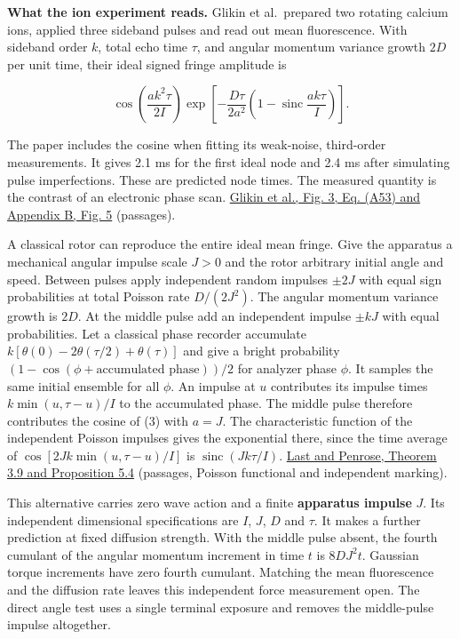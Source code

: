 \documentclass[11pt,a4paper]{article}
\begin{document}
\textbf{What the ion experiment reads.} Glikin et al.~prepared two
rotating calcium ions, applied three sideband pulses and read out mean
fluorescence. With sideband order \(k\), total echo time \(\tau\), and
angular momentum variance growth \(2D\) per unit time, their ideal
signed fringe amplitude is

\[
 \cos\!\left(\frac{a k^2\tau}{2I}\right)
 \exp\!\left[-\frac{D\tau}{2a^2}
       \left(1-\operatorname{sinc}\frac{ak\tau}{I}\right)\right].
                                                                    \tag{3}
\]

The paper includes the cosine when fitting its weak-noise, third-order
measurements. It gives 2.1 ms for the first ideal node and 2.4 ms after
simulating pulse imperfections. These are predicted node times. The
measured quantity is the contrast of an electronic phase scan.
\href{https://arxiv.org/pdf/2310.13293\#page=11}{Glikin et al., Fig. 3,
Eq. (A53) and Appendix B, Fig. 5} (passages).

A classical rotor can reproduce the entire ideal mean fringe. Give the
apparatus a mechanical angular impulse scale \(J>0\) and the rotor
arbitrary initial angle and speed. Between pulses apply independent
random impulses \(\pm 2J\) with equal sign probabilities at total
Poisson rate \(D/(2J^2)\). The angular momentum variance growth is
\(2D\). At the middle pulse add an independent impulse \(\pm kJ\) with
equal probabilities. Let a classical phase recorder accumulate
\(k[\theta(0)-2\theta(\tau/2)+\theta(\tau)]\) and give a bright
probability \((1-\cos(\phi+\text{accumulated phase}))/2\) for analyzer
phase \(\phi\). It samples the same initial ensemble for all \(\phi\).
An impulse at \(u\) contributes its impulse times \(k\min(u,\tau-u)/I\)
to the accumulated phase. The middle pulse therefore contributes the
cosine of (3) with \(a=J\). The characteristic function of the
independent Poisson impulses gives the exponential there, since the time
average of \(\cos[2Jk\min(u,\tau-u)/I]\) is
\(\operatorname{sinc}(Jk\tau/I)\).
\href{https://stoch.math.kit.edu/img/Last/lastpenrose2017.pdf}{Last and
Penrose, Theorem 3.9 and Proposition 5.4} (passages, Poisson functional
and independent marking).

This alternative carries zero wave action and a finite \textbf{apparatus
impulse} \(J\). Its independent dimensional specifications are \(I\),
\(J\), \(D\) and \(\tau\). It makes a further prediction at fixed
diffusion strength. With the middle pulse absent, the fourth cumulant of
the angular momentum increment in time \(t\) is \(8DJ^2t\). Gaussian
torque increments have zero fourth cumulant. Matching the mean
fluorescence and the diffusion rate leaves this independent force
measurement open. The direct angle test uses a single terminal exposure
and removes the middle-pulse impulse altogether.
\end{document}
